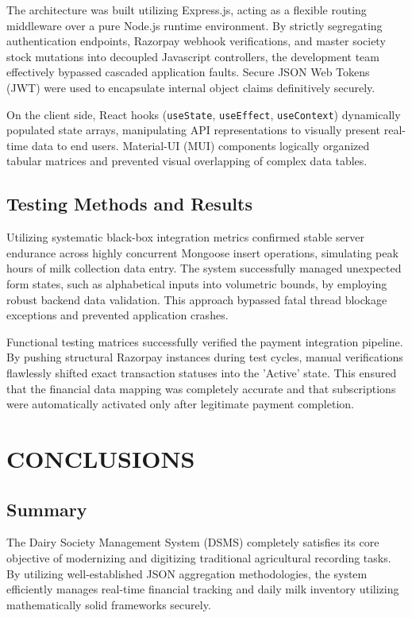 \documentclass[12pt,a4paper]{report}
\begin{document}
The architecture was built utilizing Express.js, acting as a flexible routing middleware over a pure Node.js runtime environment. By strictly segregating authentication endpoints, Razorpay webhook verifications, and master society stock mutations into decoupled Javascript controllers, the development team effectively bypassed cascaded application faults. Secure JSON Web Tokens (JWT) were used to encapsulate internal object claims definitively securely.

On the client side, React hooks (\texttt{useState}, \texttt{useEffect}, \texttt{useContext}) dynamically populated state arrays, manipulating API representations to visually present real-time data to end users. Material-UI (MUI) components logically organized tabular matrices and prevented visual overlapping of complex data tables.

\section{Testing Methods and Results}
Utilizing systematic black-box integration metrics confirmed stable server endurance across highly concurrent Mongoose insert operations, simulating peak hours of milk collection data entry. The system successfully managed unexpected form states, such as alphabetical inputs into volumetric bounds, by employing robust backend data validation. This approach bypassed fatal thread blockage exceptions and prevented application crashes.

Functional testing matrices successfully verified the payment integration pipeline. By pushing structural Razorpay instances during test cycles, manual verifications flawlessly shifted exact transaction statuses into the 'Active' state. This ensured that the financial data mapping was completely accurate and that subscriptions were automatically activated only after legitimate payment completion.

\chapter{CONCLUSIONS}
\section{Summary}
The Dairy Society Management System (DSMS) completely satisfies its core objective of modernizing and digitizing traditional agricultural recording tasks. By utilizing well-established JSON aggregation methodologies, the system efficiently manages real-time financial tracking and daily milk inventory utilizing mathematically solid frameworks securely.
\end{document}
